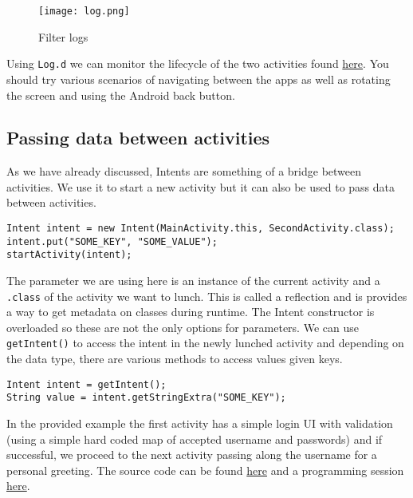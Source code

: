 \begin{figure}[H]
\centering
\texttt{[image: log.png]}
\caption{Filter logs}
\label{fig:logfilt}
\end{figure}

Using \texttt{Log.d} we can monitor the lifecycle of the two activities found \href{https://github.com/JonSteinn/AndroidDevelopment/tree/master/examples/lab3/lifecycle}{here}. You should try various scenarios of navigating between the apps as well as rotating the screen and using the Android back button.

\subsection{Passing data between activities}
As we have already discussed, Intents are something of a bridge between activities. We use it to start a new activity but it can also be used to pass data between activities.

\begin{lstlisting}[style=A_Java]
Intent intent = new Intent(MainActivity.this, SecondActivity.class);
intent.put("SOME_KEY", "SOME_VALUE");
startActivity(intent);
\end{lstlisting}

The parameter we are using here is an instance of the current activity and a \texttt{.class} of the activity we want to lunch. This is called a reflection and is provides a way to get metadata on classes during runtime. The Intent constructor is overloaded so these are not the only options for parameters. We can use \texttt{getIntent()} to access the intent in the newly lunched activity and depending on the data type, there are various methods to access values given keys.

\begin{lstlisting}[style=A_Java]
Intent intent = getIntent();
String value = intent.getStringExtra("SOME_KEY");
\end{lstlisting}

In the provided example the first activity has a simple login UI with validation (using a simple hard coded map of accepted username and passwords) and if successful, we proceed to the next activity passing along the username for a personal greeting. The source code can be found \href{https://github.com/JonSteinn/AndroidDevelopment/tree/master/examples/lab3/login}{here} and a programming session \href{https://youtu.be/DQuHUJN1H7o}{here}.\\

